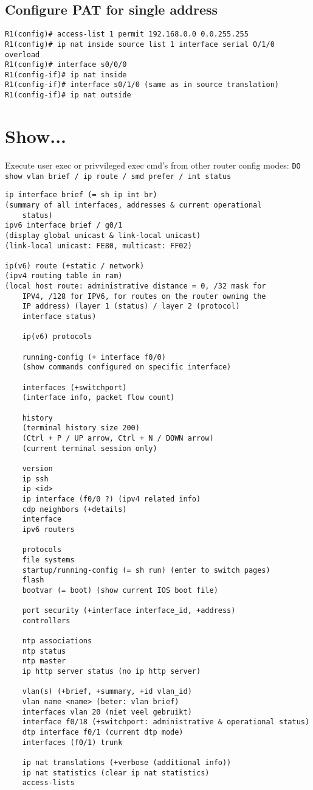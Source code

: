 \documentclass[10pt, a4paper]{article}
\begin{document}
\subsection{Configure PAT for single address}
\begin{lstlisting}
R1(config)# access-list 1 permit 192.168.0.0 0.0.255.255
R1(config)# ip nat inside source list 1 interface serial 0/1/0 overload
R1(config)# interface s0/0/0
R1(config-if)# ip nat inside
R1(config-if)# interface s0/1/0 (same as in source translation)
R1(config-if)# ip nat outside
\end{lstlisting}


\section{Show...}
Execute user exec or privvileged exec cmd's from other
router config modes: \texttt{DO show vlan brief / ip route / smd prefer / int status} \\

\begin{lstlisting}
ip interface brief (= sh ip int br)
(summary of all interfaces, addresses & current operational
	status)
ipv6 interface brief / g0/1
(display global unicast & link-local unicast)
(link-local unicast: FE80, multicast: FF02)

ip(v6) route (+static / network)
(ipv4 routing table in ram)
(local host route: administrative distance = 0, /32 mask for
	IPV4, /128 for IPV6, for routes on the router owning the
	IP address) (layer 1 (status) / layer 2 (protocol)
	interface status)

	ip(v6) protocols

	running-config (+ interface f0/0)
	(show commands configured on specific interface)

	interfaces (+switchport)
	(interface info, packet flow count)

	history
	(terminal history size 200)
	(Ctrl + P / UP arrow, Ctrl + N / DOWN arrow)
	(current terminal session only)

	version
	ip ssh
	ip <id>
	ip interface (f0/0 ?) (ipv4 related info)
	cdp neighbors (+details)
	interface
	ipv6 routers

	protocols
	file systems
	startup/running-config (= sh run) (enter to switch pages)
	flash
	bootvar (= boot) (show current IOS boot file)

	port security (+interface interface_id, +address)
	controllers

	ntp associations
	ntp status
	ntp master
	ip http server status (no ip http server)

	vlan(s) (+brief, +summary, +id vlan_id)
	vlan name <name> (beter: vlan brief)
	interfaces vlan 20 (niet veel gebruikt)
	interface f0/18 (+switchport: administrative & operational status)
	dtp interface f0/1 (current dtp mode)
	interfaces (f0/1) trunk

	ip nat translations (+verbose (additional info))
	ip nat statistics (clear ip nat statistics)
	access-lists
	\end{lstlisting}
\end{document}
